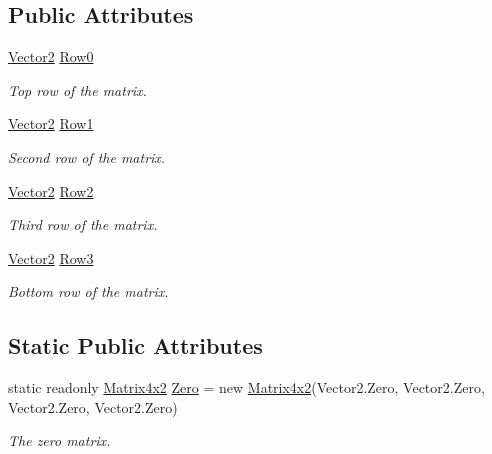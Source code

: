\subsection*{Public Attributes}
\begin{DoxyCompactItemize}
\item 
\hyperlink{struct_open_t_k_1_1_vector2}{Vector2} \hyperlink{struct_open_t_k_1_1_matrix4x2_a6c7af08b8613147aac1431374e251d23}{Row0}
\begin{DoxyCompactList}\small\item\em Top row of the matrix. \end{DoxyCompactList}\item 
\hyperlink{struct_open_t_k_1_1_vector2}{Vector2} \hyperlink{struct_open_t_k_1_1_matrix4x2_a6646ce8b78c6e5d2e9b9bc350e2c7a6f}{Row1}
\begin{DoxyCompactList}\small\item\em Second row of the matrix. \end{DoxyCompactList}\item 
\hyperlink{struct_open_t_k_1_1_vector2}{Vector2} \hyperlink{struct_open_t_k_1_1_matrix4x2_ac5b2e729263edbd5dac2f2fe35f230b7}{Row2}
\begin{DoxyCompactList}\small\item\em Third row of the matrix. \end{DoxyCompactList}\item 
\hyperlink{struct_open_t_k_1_1_vector2}{Vector2} \hyperlink{struct_open_t_k_1_1_matrix4x2_ae65b8f3e6f77574480ca2105ce162aa6}{Row3}
\begin{DoxyCompactList}\small\item\em Bottom row of the matrix. \end{DoxyCompactList}\end{DoxyCompactItemize}
\subsection*{Static Public Attributes}
\begin{DoxyCompactItemize}
\item 
static readonly \hyperlink{struct_open_t_k_1_1_matrix4x2}{Matrix4x2} \hyperlink{struct_open_t_k_1_1_matrix4x2_a13379b481a9b39b14d60e28ee70ee67f}{Zero} = new \hyperlink{struct_open_t_k_1_1_matrix4x2}{Matrix4x2}(Vector2.\-Zero, Vector2.\-Zero, Vector2.\-Zero, Vector2.\-Zero)
\begin{DoxyCompactList}\small\item\em The zero matrix. \end{DoxyCompactList}\end{DoxyCompactItemize}
